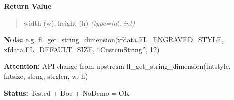 \begin{boxedminipage}{\funcwidth}
      \textbf{Return Value}
    \vspace{-1ex}

      \begin{quote}

width (w), height (h)
      {\it (type=int, int)}

      \end{quote}

\textbf{Note:} 
e.g. fl\_get\_string\_dimension(xfdata.FL\_ENGRAVED\_STYLE,
xfdata.FL\_DEFAULT\_SIZE, ``CustomString'', 12)


\textbf{Attention:} 
API change from upstream
fl\_get\_string\_dimension(fntstyle, fntsize, strng, strglen, w, h)


\textbf{Status:} 
Tested + Doc + NoDemo = OK


    \end{boxedminipage}

    \label{xformslib:flbasic:fl_get_string_dimension}

    \vspace{0.5ex}

